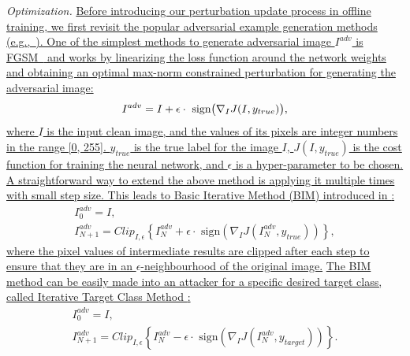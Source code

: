 \documentclass[journal]{IEEEtran}
\newcommand{\eg}{e.g.}
\begin{document}
\textit{Optimization.}
\uline{Before introducing our perturbation update process in offline training, we first revisit the popular adversarial example generation methods (\eg,~\cite{FGSM, DBLP:conf/iclr/KurakinGB17a}). One of the simplest methods to generate adversarial image $I^{adv}$ is FGSM~\cite{FGSM} and works by linearizing the loss function around the network weights and obtaining an optimal max-norm constrained perturbation for generating the adversarial image:}
\begin{equation}
    I^{adv} = I + \epsilon \cdot \text{ sign} \bigl( \nabla_I J(I, y_{true})  \bigr),
    \vspace{-0.1cm}
\end{equation}
\uline{where $I$ is the input clean image, and the values of its pixels are integer numbers in the range [0, 255]. $y_{true}$ is the true label for the image $I$, $J(I, y_{true})$ is the cost function for training the neural network, and $\epsilon$ is a hyper-parameter to be chosen. A straightforward way to extend the above method is applying it multiple times with small step size. This leads to Basic Iterative Method (BIM) introduced in \cite{DBLP:conf/iclr/KurakinGB17a}:}
\begin{equation}
    \begin{gathered}
        I_0^{adv} = I, \\
        I_{N+1}^{adv} = Clip_{I, \epsilon}\left\{I_N^{adv}+\epsilon \cdot \text{ sign}(\nabla_I J(I_N^{adv},y_{true}))\right\},
    \end{gathered}
\end{equation}
\uline{where the pixel values of intermediate results are clipped after each step to ensure that they are in
an $\epsilon$-neighbourhood of the original image.}
\uline{The BIM method can be easily made into an attacker for a specific desired target class, called Iterative Target Class Method \cite{DBLP:conf/iclr/KurakinGB17a}:}
\begin{equation}
  \begin{gathered}
      I_0^{adv} = I,\\
      I_{N+1}^{adv} = Clip_{I, \epsilon}\left\{I_N^{adv}-\epsilon \cdot \text{ sign}(\nabla_I J(I_N^{adv},y_{target}))\right\}.
  \end{gathered}
  \label{equ:itcm}
\end{equation}
\end{document}
